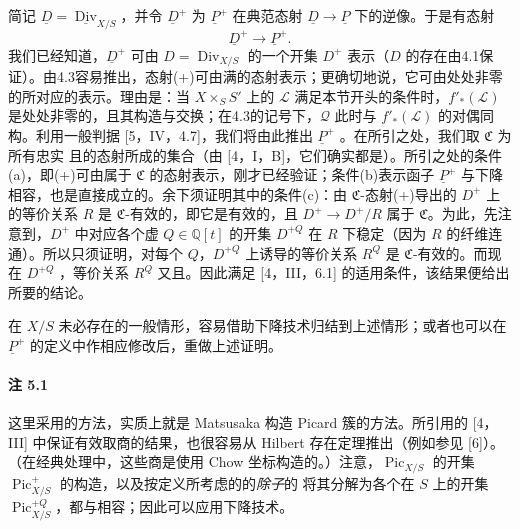 简记 $\underline D=\underline{\operatorname{Div}}_{X/S}$，并令 $\underline D^+$ 为 $\underline P^+$ 在典范态射 $\underline D\to\underline P$ 下的逆像。于是有态射
\[\underline D^+\longrightarrow\underline P^+.\tag{+}\]
我们已经知道，$\underline D^+$ 可由 $D=\operatorname{Div}_{X/S}$ 的一个开集 $D^+$ 表示（$D$ 的存在由4.1保证）。由4.3容易推出，态射(+)可由满的态射表示；更确切地说，它可由处处非零的所对应的表示。理由是：当 $X\times_S S'$ 上的 $\mathcal L$ 满足本节开头的条件时，$f'_*(\mathcal L)$ 是处处非零的，且其构造与交换；在4.3的记号下，$\mathcal Q$ 此时与 $f'_*(\mathcal L)$ 的对偶同构。利用一般判据 [5，IV，4.7]，我们将由此推出 $\underline P^+$ 。在所引之处，我们取 $\mathfrak C$ 为所有忠实
且的态射所成的集合（由 [4，I，B]，它们确实都是）。所引之处的条件(a)，即(+)可由属于 $\mathfrak C$ 的态射表示，刚才已经验证；条件(b)表示函子 $\underline P^+$ 与下降相容，也是直接成立的。余下须证明其中的条件(c)：由 $\mathfrak C$-态射(+)导出的 $D^+$ 上的等价关系 $R$ 是 $\mathfrak C$-有效的，即它是有效的，且 $D^+\to D^+/R$ 属于 $\mathfrak C$。为此，先注意到，$D^+$ 中对应各个虚  $Q\in\mathbb Q[t]$ 的开集 $D^{+Q}$ 在 $R$ 下稳定（因为 $R$ 的纤维连通）。所以只须证明，对每个 $Q$，$D^{+Q}$ 上诱导的等价关系 $R^Q$ 是 $\mathfrak C$-有效的。而现在 $D^{+Q}$ ，等价关系 $R^Q$ 又且。因此满足 [4，III，6.1] 的适用条件，该结果便给出所要的结论。

在 $X/S$ 未必存在的一般情形，容易借助下降技术归结到上述情形；或者也可以在 $\underline P^+$ 的定义中作相应修改后，重做上述证明。

\paragraph{注 5.1}
这里采用的方法，实质上就是 Matsusaka 构造 Picard 簇的方法。所引用的 [4，III] 中保证有效取商的结果，也很容易从 Hilbert 存在定理推出（例如参见 [6]）。（在经典处理中，这些商是使用 Chow 坐标构造的。）注意，$\operatorname{Pic}_{X/S}$ 的开集 $\operatorname{Pic}^+_{X/S}$ 的构造，以及按定义所考虑的的\emph{除子}的 将其分解为各个在 $S$ 上的开集 $\operatorname{Pic}^{+Q}_{X/S}$，都与相容；因此可以应用下降技术。

